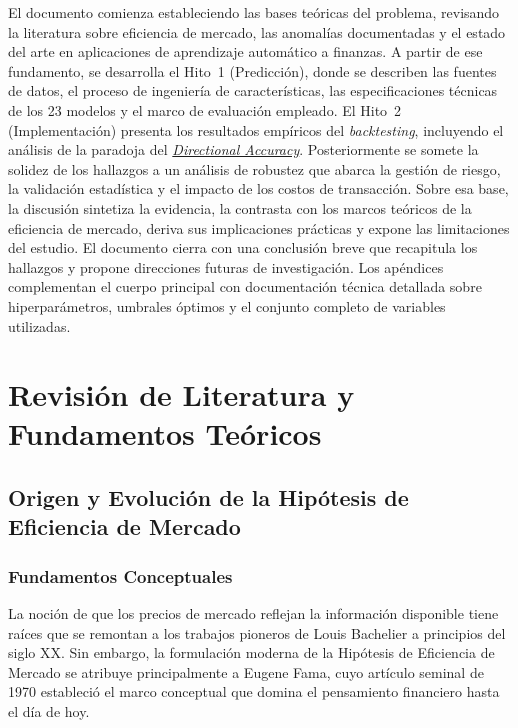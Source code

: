 ﻿\documentclass[11pt,a4paper]{article}
\begin{document}
El documento comienza estableciendo las bases te\'oricas del problema, revisando la literatura sobre eficiencia de mercado, las anomal\'ias documentadas y el estado del arte en aplicaciones de aprendizaje autom\'atico a finanzas. A partir de ese fundamento, se desarrolla el Hito~1 (Predicci\'on), donde se describen las fuentes de datos, el proceso de ingenier\'ia de caracter\'isticas, las especificaciones t\'ecnicas de los 23 modelos y el marco de evaluaci\'on empleado. El Hito~2 (Implementaci\'on) presenta los resultados emp\'iricos del \textit{backtesting}, incluyendo el an\'alisis de la paradoja del \hyperlink{glos:directional_accuracy}{\textit{Directional Accuracy}}. Posteriormente se somete la solidez de los hallazgos a un an\'alisis de robustez que abarca la gesti\'on de riesgo, la validaci\'on estad\'istica y el impacto de los costos de transacci\'on. Sobre esa base, la discusi\'on sintetiza la evidencia, la contrasta con los marcos te\'oricos de la eficiencia de mercado, deriva sus implicaciones pr\'acticas y expone las limitaciones del estudio. El documento cierra con una conclusi\'on breve que recapitula los hallazgos y propone direcciones futuras de investigaci\'on. Los ap\'endices complementan el cuerpo principal con documentaci\'on t\'ecnica detallada sobre hiperpar\'ametros, umbrales \'optimos y el conjunto completo de variables utilizadas.

\section{Revisi\'on de Literatura y Fundamentos Te\'oricos}

\subsection{Origen y Evoluci\'on de la Hip\'otesis de Eficiencia de Mercado}

\subsubsection{Fundamentos Conceptuales}

La noci\'on de que los precios de mercado reflejan la informaci\'on disponible tiene ra\'ices que se remontan a los trabajos pioneros de Louis Bachelier a principios del siglo XX. Sin embargo, la formulaci\'on moderna de la Hip\'otesis de Eficiencia de Mercado se atribuye principalmente a Eugene Fama, cuyo art\'iculo seminal de 1970 estableci\'o el marco conceptual que domina el pensamiento financiero hasta el d\'ia de hoy.
\end{document}
